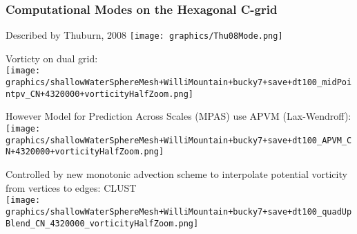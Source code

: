 \begin{frame}
\frametitle{Computational Modes on the Hexagonal C-grid}

\begin{minipage}{0.49\linewidth}\centering
Described by Thuburn, 2008
\texttt{[image: graphics/Thu08Mode.png]}
\pause
\end{minipage}
\begin{minipage}{0.49\linewidth}
Vorticty on dual grid:\\
\texttt{[image: graphics/shallowWaterSphereMesh+WilliMountain+bucky7+save+dt100\_midPointpv\_CN+4320000+vorticityHalfZoom.png]}
\pause
\end{minipage}
\begin{minipage}{0.49\linewidth}\centering\small
However Model for Prediction Across Scales (MPAS) use APVM (Lax-Wendroff):\\
\texttt{[image: graphics/shallowWaterSphereMesh+WilliMountain+bucky7+save+dt100\_APVM\_CN+4320000+vorticityHalfZoom.png]}
\end{minipage}
\pause
\begin{minipage}{0.49\linewidth}\raggedright\small
Controlled by new monotonic advection scheme to interpolate potential vorticity from vertices to edges: CLUST\\
\texttt{[image: graphics/shallowWaterSphereMesh+WilliMountain+bucky7+save+dt100\_quadUpBlend\_CN\_4320000\_vorticityHalfZoom.png]}

\end{minipage}

\end{frame}

